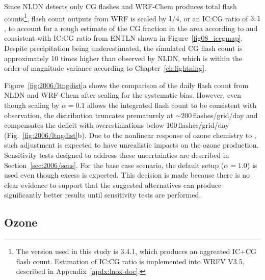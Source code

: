 Since NLDN detects only CG flashes and WRF-Chem produces total flash counts\footnote{The version used in this study is 3.4.1,
which produces an aggreated IC+CG flash count. Estimation of IC:CG ratio is implemented into WRFV V3.5, described in
Appendix~\ref{apdx:lnox-doc}.}, flash count outputs from WRF is scaled by $1/4$, or an IC:CG ratio of $3:1$, to account
for a rough estimate of the CG fraction in the area according to \citet{Boccippio:2001ys} and consistent with IC:CG ratio from ENTLN
shown in Figure~\ref{fig08_iccgmap}. Despite precipitation being underestimated, the simulated CG flash count is approximately
10 times higher than observed by NLDN, which is within the order-of-magnitude variance according to Chapter~\ref{ch:lightning}.

Figure~\ref{fig:2006/ltngdist}a shows the comparison of the daily flash count from NLDN and WRF-Chem after scaling for the
systematic bias. However, even though scaling by $\alpha=0.1$ allows the integrated flash count to be consistent with observation,
the distribution truncates prematurely at $\sim200$\,\unit{flashes/grid/day} and compensates the deficit with overestimations
below 100\,\unit{flashes/grid/day} (Fig.~\ref{fig:2006/ltngdist}b). Due to the nonlinear response of ozone chemistry to {\lnox}, such adjustment is
expected to have unrealistic impacts on the ozone production. Sensitivity tests designed to address these uncertainties are described in
Section~\ref{sec:2006/sens}. For the base case scenario, the default setup ($\alpha=1.0$) is used even though excess {\lnox}
is expected. This decision is made because there is no clear evidence to support that the suggested alternatives can
produce significantly better results until sensitivity tests are performed.

\subsection{Ozone}\label{ssec:2006/gen/ozone}

